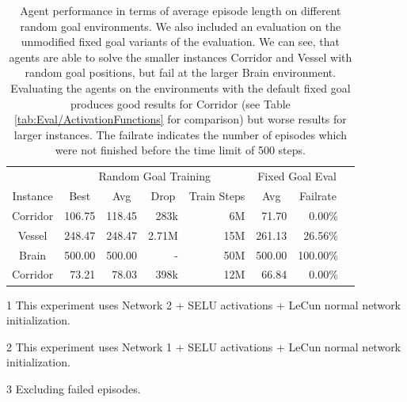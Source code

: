 \begin{table}[htp]
    \begin{center}
        \begin{threeparttable}
            \begin{tabular}{crrrrrrr}
                \toprule
                 & \multicolumn{4}{c}{Random Goal Training} & \multicolumn{2}{c}{Fixed Goal Eval} \\
                \cmidrule(lr){2-5} \cmidrule(lr){6-7}
                \multicolumn{1}{c}{Instance} & \multicolumn{1}{c}{Best} & \multicolumn{1}{c}{Avg} & \multicolumn{1}{c}{Drop} & \multicolumn{1}{c}{Train Steps} & \multicolumn{1}{c}{Avg} & \multicolumn{1}{c}{Failrate}\\
                \midrule
                Corridor\tnote{1} & 106.75 & 118.45 & 283k & 6M & 71.70 & 0.00\% \\
                Vessel\tnote{2} & 248.47 & 248.47 & 2.71M & 15M & 261.13\tnote{3} & 26.56\% \\
                Brain\tnote{1} & 500.00 & 500.00 & - & 50M &  500.00 & 100.00\%\\
                \midrule
                Corridor\tnote{2} & 73.21 & 78.03 & 398k & 12M & 66.84 & 0.00\% \\
                \bottomrule
            \end{tabular}
            \begin{tablenotes}
                \footnotesize
                \item[1] This experiment uses Network 2 + SELU activations + LeCun normal network initialization.
                \item[2] This experiment uses Network 1 + SELU activations + LeCun normal network initialization.
                \item[3] Excluding failed episodes. 
            \end{tablenotes}

        \end{threeparttable}
        \caption[Evaluation Results for Agents on Random Goal Environments]{Agent performance in terms of average episode length on different random goal environments. We also included an evaluation on the unmodified fixed goal variants of the evaluation. We can see, that agents are able to solve the smaller instances Corridor and Vessel with random goal positions, but fail at the larger Brain environment. Evaluating the agents on the environments with the default fixed goal produces good results for Corridor (see Table \ref{tab:Eval/ActivationFunctions} for comparison) but worse results for larger instances. The failrate indicates the number of episodes which were not finished before the time limit of 500 steps.} \label{tab:Eval/RandomGoal/All}
    \end{center}
\end{table}


